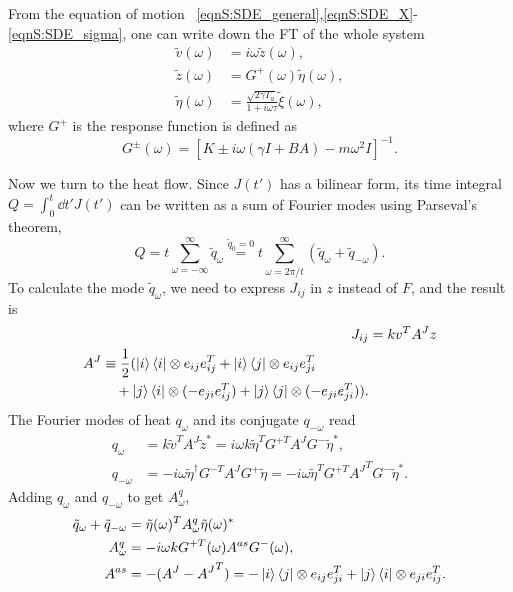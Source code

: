 \documentclass[
 amsmath,amssymb,
 aps,
 pre,
 longbibliography,
 10pt, onecolumn,
 notitlepage
]{revtex4-1}
\begin{document}
From the equation of motion \eqnname~\eqref{eqnS:SDE_general},\eqref{eqnS:SDE_X}-\eqref{eqnS:SDE_sigma}, one can write down the FT of the whole system
\begin{align}
\tilde{v}(\omega) &= i\omega \tilde{z}(\omega) ,\label{eqnS:FT_v}\\
\tilde{z}(\omega) &= G^+(\omega) \tilde{\eta}(\omega) ,\label{eqnS:FT_z}\\
\tilde{\eta}(\omega) &= \frac{\sqrt{2\gamma T_a}}{1 + i\omega \tau} \tilde{\xi}(\omega) ,\label{eqnS:FT_eta}
\end{align}
where $G^+$ is the response function is defined as
\begin{equation} \label{eqnS:response}
G^{\pm}(\omega) = [K \pm i\omega(\gamma I + BA) - m\omega^2I]^{-1} .
\end{equation}

Now we turn to the heat flow. 
Since $J(t')$ has a bilinear form, its time integral $Q = \int_0^t \dd{t'} J(t')$ can be written as a sum of Fourier modes using Parseval's theorem,
\begin{equation} \label{eqnS:qmode_sum}
Q = t\sum_{\omega=-\infty}^{\infty} \tilde{q}_\omega
\overset{\tilde{q}_0 = 0}{=}  t\sum_{\omega=2\pi/t}^{\infty} (\tilde{q}_\omega + \tilde{q}_{-\omega}) .
\end{equation}
To calculate the mode $\tilde{q}_\omega$, we need to express $J_{ij}$ in $z$ instead of $F$, and the result is
\begin{align}
J_{ij} &= kv^TA^{J}z \\
\begin{split}
A^{J} &\equiv \frac{1}{2} (\ket{i}\bra{i} \otimes e_{ij}e_{ij}^T + \ket{i}\bra{j} \otimes e_{ij}e_{ji}^T \\
&\quad + \ket{j}\bra{i} \otimes (-e_{ji}e_{ij}^T) + \ket{j}\bra{j} \otimes (-e_{ji}e_{ji}^T)) .
\end{split}
\end{align}
The Fourier modes of heat $q_\omega$ and its conjugate $q_{-\omega}$ read
\begin{align}
q_\omega &= k\tilde{v}^T A^{J} \tilde{z}^*
= i\omega k \tilde{\eta}^TG^{+T}A^{J}G^-\tilde{\eta}^* ,\\
q_{-\omega} &= -i\omega \tilde{\eta}^\dagger G^{-T}A^{J}G^+\tilde{\eta}
= -i\omega \tilde{\eta}^TG^{+T}{A^{J}}^TG^-\tilde{\eta}^* .
\end{align}
Adding $q_\omega$ and $q_{-\omega}$ to get $A_\omega^q$, 
\begin{align}
\tilde{q}_\omega + \tilde{q}_{-\omega} &= \tilde{\eta}(\omega)^T A_\omega^q \tilde{\eta}(\omega)^* \\
A_\omega^q &= -i\omega k G^{+T}(\omega) A^{as} G^-(\omega), \\
A^{as} &= -(A^{J} - {A^{J}}^T)
= -\ket{i}\bra{j} \otimes e_{ij}e_{ji}^T + \ket{j}\bra{i} \otimes e_{ji}e_{ij}^T .
\end{align}
\end{document}
